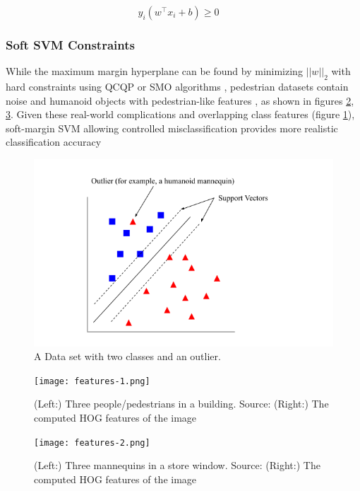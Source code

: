 \begin{equation}\label{hyper_inequality}
y_{i}(w^\top x_{i}+b)\ge 0 \quad 
\end{equation}

\subsubsection{Soft SVM Constraints}\label{sec:soft_constraint_svm}

While the maximum margin hyperplane can be found by minimizing $||w||_{2}$ with hard constraints using QCQP or SMO algorithms \cite{chang_lin_2011_libsvm}, pedestrian datasets contain noise \cite{Zhang_2016_CVPR} and humanoid objects with pedestrian-like features \cite{karthika_2020_addressing}, as shown in figures \ref{fig:pedestrian_features}, \ref{fig:manequin_features}. Given these real-world complications and overlapping class features (figure \ref{fig:outliers}), soft-margin SVM allowing controlled misclassification provides more realistic classification accuracy \cite{dalal_2005_histograms} \cite{cornell_svm_continued}

\begin{figure}
    \centering
    \includegraphics[width=0.75\linewidth]{images/outliers.png}
    \caption{A Data set with two classes and an outlier.}
    \label{fig:outliers}
\end{figure}


\begin{figure}
    \texttt{[image: features-1.png]}
    \caption{(Left:) Three people/pedestrians in a building. Source: \cite{person_img} (Right:) The computed HOG features of the image}
    \label{fig:pedestrian_features}
\end{figure}

\begin{figure}
    \texttt{[image: features-2.png]}
    \caption{(Left:) Three mannequins in a store window. Source: \cite{mannequin_img} (Right:) The computed HOG features of the image}
    \label{fig:manequin_features}
\end{figure}

